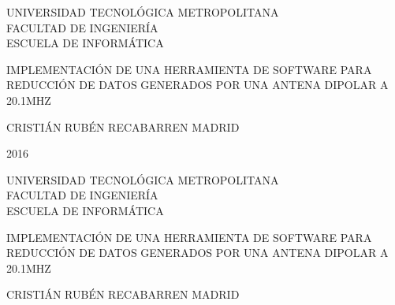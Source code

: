 
\thispagestyle{empty}
\begin{center}

UNIVERSIDAD TECNOLÓGICA METROPOLITANA\\
FACULTAD DE INGENIERÍA\\
ESCUELA DE INFORMÁTICA\\

\vspace{5cm}

IMPLEMENTACIÓN DE UNA HERRAMIENTA DE SOFTWARE PARA REDUCCIÓN DE DATOS GENERADOS POR UNA ANTENA DIPOLAR A 20.1MHZ

\vspace{5cm}

CRISTIÁN RUBÉN RECABARREN MADRID

\vfill

2016
\end{center}

\newpage
\thispagestyle{empty}

\begin{center}
UNIVERSIDAD TECNOLÓGICA METROPOLITANA\\
FACULTAD DE INGENIERÍA\\
ESCUELA DE INFORMÁTICA\\

\vskip 1cm

IMPLEMENTACIÓN DE UNA HERRAMIENTA DE SOFTWARE PARA REDUCCIÓN DE DATOS GENERADOS POR UNA ANTENA DIPOLAR A 20.1MHZ

\vskip 1cm

CRISTIÁN RUBÉN RECABARREN MADRID

\vskip 1.8cm

\end{center}

